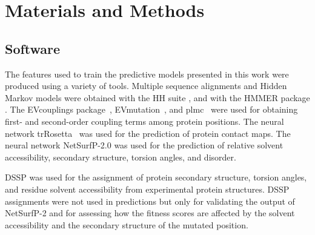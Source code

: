 \thispagestyle{empty}
\cleardoublepage%
\chapter{Materials and Methods}

\section{Software}
The features used to train the predictive models presented in this work were produced using a variety of tools.
Multiple sequence alignments and Hidden Markov models were obtained with the HH suite \parencite[version 3.3.0]{Steinegger2019}, and with the HMMER package \parencite[version 3.3.2]{Eddy2011}.
The EVcouplings package~\parencite[version 0.1.1]{Hopf2018}, EVmutation~\parencite[installed as part of EVcouplings]{Hopf2017}, and plmc~\parencite[installed from \url{https://github.com/debbiemarkslab/plmc} in March 2021]{Hopf2017} were used for obtaining first- and second-order coupling terms among protein positions.
The neural network trRosetta~\parencite[installed from \url{https://github.com/gjoni/trRosetta} in March 2021 and using the trained model \texttt{2019\_07}]{Yang2020} was used for the prediction of protein contact maps.
The neural network NetSurfP-2.0 \parencite{Klausen2019} was used for the prediction of relative solvent accessibility, secondary structure, torsion angles, and disorder.

DSSP \parencite[Define Secondary Structure of Protein,][version 3.1.2]{Kabsch1983} was used for the assignment of protein secondary structure, torsion angles, and residue solvent accessibility from experimental protein structures.
DSSP assignments were not used in predictions but only for validating the output of NetSurfP-2 and for assessing how the fitness scores are affected by the solvent accessibility and the secondary structure of the mutated position.

